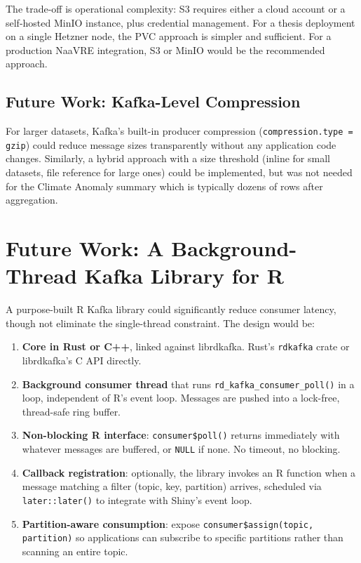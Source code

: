\documentclass[11pt,a4paper]{article}
\begin{document}
The trade-off is operational complexity: S3 requires either a cloud account or
a self-hosted MinIO instance, plus credential management. For a thesis
deployment on a single Hetzner node, the PVC approach is simpler and sufficient.
For a production NaaVRE integration, S3 or MinIO would be the recommended
approach.

\subsection{Future Work: Kafka-Level Compression}

For larger datasets, Kafka's built-in producer compression
(\texttt{compression.type = gzip}) could reduce message sizes transparently
without any application code changes. Similarly, a hybrid approach with a size
threshold (inline for small datasets, file reference for large ones) could be
implemented, but was not needed for the Climate Anomaly summary which is
typically dozens of rows after aggregation.

\section{Future Work: A Background-Thread Kafka Library for R}

A purpose-built R Kafka library could significantly reduce consumer
latency, though not eliminate the single-thread constraint. The design
would be:

\begin{enumerate}
  \item \textbf{Core in Rust or C++}, linked against librdkafka.
        Rust's \texttt{rdkafka} crate or librdkafka's C API directly.
  \item \textbf{Background consumer thread} that runs
        \texttt{rd\_kafka\_consumer\_poll()} in a loop, independent of R's
        event loop. Messages are pushed into a lock-free, thread-safe
        ring buffer.
  \item \textbf{Non-blocking R interface}: \texttt{consumer\$poll()} returns
        immediately with whatever messages are buffered, or
        \texttt{NULL} if none. No timeout, no blocking.
  \item \textbf{Callback registration}: optionally, the library invokes
        an R function when a message matching a filter (topic, key,
        partition) arrives, scheduled via \texttt{later::later()} to
        integrate with Shiny's event loop.
  \item \textbf{Partition-aware consumption}: expose
        \texttt{consumer\$assign(topic, partition)} so applications can
        subscribe to specific partitions rather than scanning an entire
        topic.
\end{enumerate}
\end{document}
